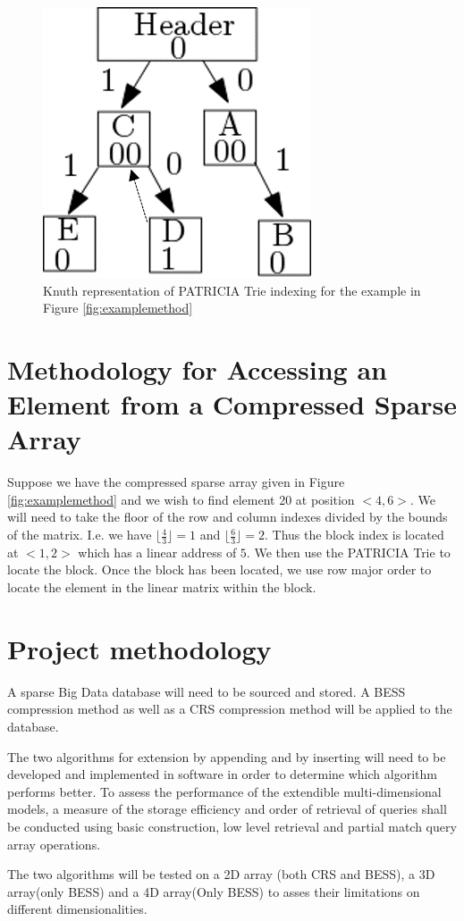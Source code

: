  \begin{figure}[H]
 	\centering
 	\includegraphics[width=0.25\linewidth]{knuth1}
 	\caption{Knuth representation of PATRICIA Trie indexing for the example in Figure \ref{fig:examplemethod}}
 	\label{fig:knuth}
 \end{figure}
 
 \section{Methodology for Accessing an Element from a Compressed Sparse Array}
 Suppose we have the compressed sparse array given in Figure \ref{fig:examplemethod} and we wish to find element 20 at position $<4,6>$. We will need to take the floor of the row and column indexes divided by the bounds of the matrix. I.e. we have $ \lfloor\frac{4}{3}\rfloor = 1$ and $\lfloor\frac{6}{3}\rfloor = 2$. Thus the block index is located at $<1,2>$ which has a linear address of $5$. We then use the PATRICIA Trie to locate the block. Once the block has been located, we use row major order to locate the element in the linear matrix within the block.
 
 \section{Project methodology}
 A sparse Big Data database will need to be sourced and stored. A BESS compression method as well as a CRS compression method will be applied to the database.
  
 The two algorithms for extension by appending and by inserting will need to be developed and implemented in software in order to determine which algorithm performs better. To assess the performance of the extendible multi-dimensional models, a measure of the storage efficiency and order of retrieval of queries shall be conducted using basic construction, low level retrieval and partial match query array operations.
 
 The two algorithms will be tested on a 2D array (both CRS and BESS), a 3D array(only BESS) and a 4D array(Only BESS) to asses their limitations on different dimensionalities.
 
